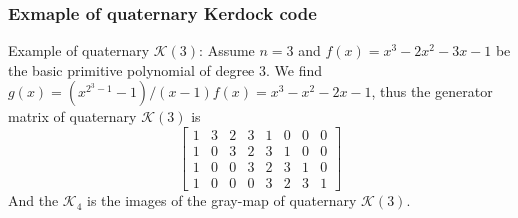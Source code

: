 \documentclass[
    aspectratio=169,                   %
]{beamer}
\begin{document}
    \begin{frame}
        \frametitle{Exmaple of quaternary Kerdock code}
    
    \begin{example}
        
        Example of quaternary $\mathcal{K}(3)$:
        Assume $ n=3 $ and $ f(x)=x^3-2x^2-3x-1 $ be the basic primitive polynomial of degree $ 3 $. We find $ g(x)=(x^{2^3-1}-1)/(x-1)f(x)=x^3-x^2-2x-1 $, thus the generator matrix of quaternary $ \mathcal{K}(3) $ is 
        \[\begin{bmatrix}
            1 & 3 &2 & 3& 1& 0&0&0\\
            1 & 0& 3 &2 & 3& 1&0 &0\\
            1 & 0&0&3 &2 & 3& 1& 0\\
            1 & 0&0&0&3 &2 & 3& 1 
        \end{bmatrix}\]
        And the $ \mathcal{K}_4 $ is the images of the gray-map of quaternary $ \mathcal{K}(3) $.
    \end{example}
    
    \end{frame}
\end{document}
